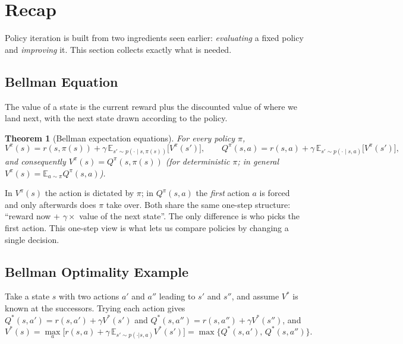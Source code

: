 \documentclass[11pt,a4paper]{article}
\newcommand{\E}{\mathbb{E}}
\theoremstyle{plain}
\newtheorem{theorem}{Theorem}[section]
\theoremstyle{definition}
\theoremstyle{remark}
\begin{document}
\section{Recap}
Policy iteration is built from two ingredients seen earlier: \emph{evaluating} a fixed policy and \emph{improving} it. This section collects exactly what is needed.

\subsection{Bellman Equation}
The value of a state is the current reward plus the discounted value of where we land next, with the next state drawn according to the policy.

\begin{theorem}[Bellman expectation equations]\label{thm:bellman-exp}
For every policy $\pi$,
\[
V^\pi(s)=r(s,\pi(s))+\gamma\,\E_{s'\sim p(\cdot\mid s,\pi(s))}\big[V^\pi(s')\big],\qquad
Q^\pi(s,a)=r(s,a)+\gamma\,\E_{s'\sim p(\cdot\mid s,a)}\big[V^\pi(s')\big],
\]
and consequently $V^\pi(s)=Q^\pi(s,\pi(s))$ (for deterministic $\pi$; in general $V^\pi(s)=\E_{a\sim\pi}Q^\pi(s,a)$).
\end{theorem}

\begin{intuition}
In $V^\pi(s)$ the action is dictated by $\pi$; in $Q^\pi(s,a)$ the \emph{first} action $a$ is forced and only afterwards does $\pi$ take over. Both share the same one-step structure: ``reward now + $\gamma\times$ value of the next state''. The only difference is who picks the first action. This one-step view is what lets us compare policies by changing a single decision.
\end{intuition}

\subsection{Bellman Optimality Example}
Take a state $s$ with two actions $a'$ and $a''$ leading to $s'$ and $s''$, and assume $V^*$ is known at the successors. Trying each action gives $Q^*(s,a')=r(s,a')+\gamma V^*(s')$ and $Q^*(s,a'')=r(s,a'')+\gamma V^*(s'')$, and
\[
V^*(s)=\max_a\Big[r(s,a)+\gamma\,\E_{s'\sim p(\cdot|s,a)}V^*(s')\Big]=\max\big\{Q^*(s,a'),\,Q^*(s,a'')\big\}.
\]
\end{document}

